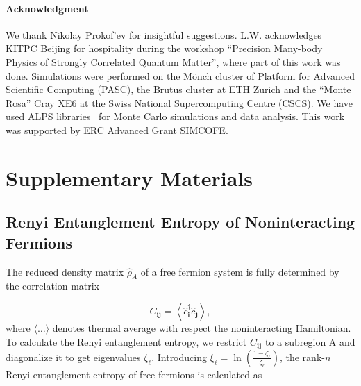 \documentclass[twocolumn,english,prl,showpacs]{revtex4}
\begin{document}
\paragraph{Acknowledgment}
We thank Nikolay Prokof'ev for insightful suggestions. L.W. acknowledges KITPC Beijing for hospitality during the workshop ``Precision Many-body Physics of Strongly Correlated Quantum Matter'', where part of this work was done. Simulations were performed on the M\"{o}nch cluster of Platform for Advanced Scientific Computing (PASC), the Brutus cluster at ETH Zurich and the ``Monte Rosa'' Cray XE6 at the Swiss National Supercomputing Centre (CSCS). We have used ALPS libraries~\cite{BBauer:2011tz} for Monte Carlo simulations and data analysis. This work was supported by ERC Advanced Grant SIMCOFE.




%



\clearpage 

\appendix
\section{Supplementary Materials}

\subsection{Renyi Entanglement Entropy of Noninteracting Fermions}

The reduced density matrix $\hat{\rho}_{A}$ of a free fermion system is fully determined by the correlation matrix~\cite{Peschel:2002gz}

\begin{equation*}
C_{\mathbf{ij}} = \left\langle  \hat{c}^{\dagger}_\mathbf{i} \hat{c}_\mathbf{j} \right\rangle,
\end{equation*}
where $\langle \ldots \rangle $ denotes thermal average with respect the noninteracting Hamiltonian. To calculate the Renyi entanglement entropy, we restrict $C_{\mathbf{ij}}$ to a subregion A and diagonalize it to get eigenvalues $\zeta_{\ell}$. Introducing $\xi_{\ell} = \ln(\frac{1-\zeta_{\ell}}{\zeta_{\ell}})$, the rank-$n$ Renyi entanglement entropy of free fermions is calculated as 
\end{document}
